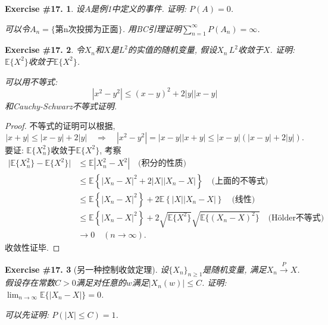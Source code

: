\documentclass[UTF8, a4paper]{article}
\newtheorem{exercise}{Exercise \#17.}
\begin{document}
\begin{framed}
\begin{exercise}
设\(A\)是例1中定义的事件. 证明: \(P(A) = 0\).

可以令\(A_n = \{\text{第n次投掷为正面}\}\).
用BC引理证明\(\sum_{n=1}^{\infty} P(A_n) = \infty\).
\end{exercise}
\end{framed}



\begin{framed}
\begin{exercise}
令\(X_n\)和\(X\)是\(L^2\)的实值的随机变量, 假设\(X_n\)\(\,L^2\)收敛于\(X\).
证明: \(\mathbb{E}\{X^2\}\)收敛于\(\mathbb{E}\{X^2\}\).

可以用不等式:
$$
|x^2 - y^2| \leq (x - y)^2 + 2|y||x - y|
$$
和Cauchy-Schwarz不等式证明.
\end{exercise}
\end{framed}


\begin{proof}
不等式的证明可以根据, 
$$
|x+y| \leq |x - y| + 2|y| \quad \Rightarrow \quad |x^2 - y^2| = |x-y||x+y| \leq |x-y|(|x-y| + 2|y|).
$$
要证: \(\mathbb{E}\{X_n^2\}\)收敛于\(\mathbb{E}\{X^2\}\), 考察
$$
\begin{aligned}
    \big|\mathbb{E}\{X_n^2\} - \mathbb{E}\{X^2\}\big| &\leq \mathbb{E}\left|X_n^2 - X^2\right| \quad \text{(积分的性质)} \\
    &\leq \mathbb{E}\left\{|X_n - X|^2 + 2|X||X_n - X|\right\} \quad \text{(上面的不等式)}\\
    &\leq \mathbb{E}\left\{|X_n - X|^2\right\} + 2\mathbb{E}\left\{|X||X_n - X|\right\} \quad \text{(线性)} \\
    &\leq \mathbb{E}\left\{|X_n - X|^2\right\} + 2\sqrt{\mathbb{E}\{X^2\}}\sqrt{\mathbb{E}\{(X_n - X)^2\}} \quad \text{(H\"older不等式)} \\
    & \to 0 \quad (n\to \infty).
\end{aligned}
$$
收敛性证毕.
\end{proof}

\begin{framed}
\begin{exercise}[另一种控制收敛定理]
设\(\{X_n\}_{n\geq 1}\)是随机变量, 满足\(X_n \overset{P}{\to} X\).
假设存在常数\(C>0\)满足对任意的\(w\)满足\(|X_n(w)| \leq C\).
证明: \(\lim_{n\to\infty} \mathbb{E}\{|X_n - X|\} = 0\).

可以先证明: \(P(|X| \leq C) = 1\).
\end{exercise}
\end{framed}
\end{document}
